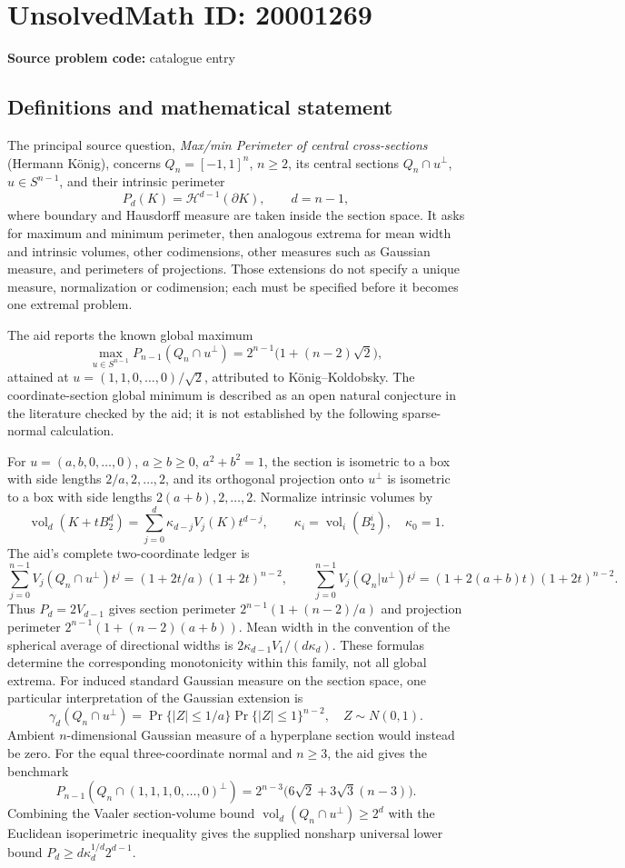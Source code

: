 \documentclass[11pt]{article}
\begin{document}
\section*{UnsolvedMath ID: 20001269}
\textbf{Source problem code:} catalogue entry
\subsection{Definitions and mathematical statement}
The principal source question, \emph{Max/min Perimeter of central cross-sections} (Hermann K\"onig), concerns \(Q_n=[-1,1]^n\), \(n\ge2\), its central sections \(Q_n\cap u^\perp\), \(u\in S^{n-1}\), and their intrinsic perimeter
\[
P_d(K)=\mathcal H^{d-1}(\partial K),\qquad d=n-1,
\]
where boundary and Hausdorff measure are taken inside the section space. It asks for maximum and minimum perimeter, then analogous extrema for mean width and intrinsic volumes, other codimensions, other measures such as Gaussian measure, and perimeters of projections. Those extensions do not specify a unique measure, normalization or codimension; each must be specified before it becomes one extremal problem.

The aid reports the known global maximum
\[
\max_{u\in S^{n-1}}P_{n-1}(Q_n\cap u^\perp)=2^{n-1}\bigl(1+(n-2)\sqrt2\bigr),
\]
attained at \(u=(1,1,0,\ldots,0)/\sqrt2\), attributed to K\"onig--Koldobsky. The coordinate-section global minimum is described as an open natural conjecture in the literature checked by the aid; it is not established by the following sparse-normal calculation.

For \(u=(a,b,0,\ldots,0)\), \(a\ge b\ge0\), \(a^2+b^2=1\), the section is isometric to a box with side lengths \(2/a,2,\ldots,2\), and its orthogonal projection onto \(u^\perp\) is isometric to a box with side lengths \(2(a+b),2,\ldots,2\). Normalize intrinsic volumes by
\[
\operatorname{vol}_d(K+tB_2^d)=\sum_{j=0}^d\kappa_{d-j}V_j(K)t^{d-j},\qquad \kappa_i=\operatorname{vol}_i(B_2^i),\quad\kappa_0=1.
\]
The aid's complete two-coordinate ledger is
\[
\sum_{j=0}^{n-1}V_j(Q_n\cap u^\perp)t^j=(1+2t/a)(1+2t)^{n-2},\qquad
\sum_{j=0}^{n-1}V_j(Q_n|u^\perp)t^j=(1+2(a+b)t)(1+2t)^{n-2}.
\]
Thus \(P_d=2V_{d-1}\) gives section perimeter \(2^{n-1}(1+(n-2)/a)\) and projection perimeter \(2^{n-1}(1+(n-2)(a+b))\). Mean width in the convention of the spherical average of directional widths is \(2\kappa_{d-1}V_1/(d\kappa_d)\). These formulas determine the corresponding monotonicity within this family, not all global extrema. For induced standard Gaussian measure on the section space, one particular interpretation of the Gaussian extension is
\[
\gamma_d(Q_n\cap u^\perp)=\Pr\{|Z|\le1/a\}\Pr\{|Z|\le1\}^{n-2},\quad Z\sim N(0,1).
\]
Ambient \(n\)-dimensional Gaussian measure of a hyperplane section would instead be zero. For the equal three-coordinate normal and \(n\ge3\), the aid gives the benchmark
\[
P_{n-1}\left(Q_n\cap(1,1,1,0,\ldots,0)^\perp\right)=2^{n-3}\bigl(6\sqrt2+3\sqrt3(n-3)\bigr).
\]
Combining the Vaaler section-volume bound \(\operatorname{vol}_d(Q_n\cap u^\perp)\ge2^d\) with the Euclidean isoperimetric inequality gives the supplied nonsharp universal lower bound \(P_d\ge d\kappa_d^{1/d}2^{d-1}\).
\end{document}
